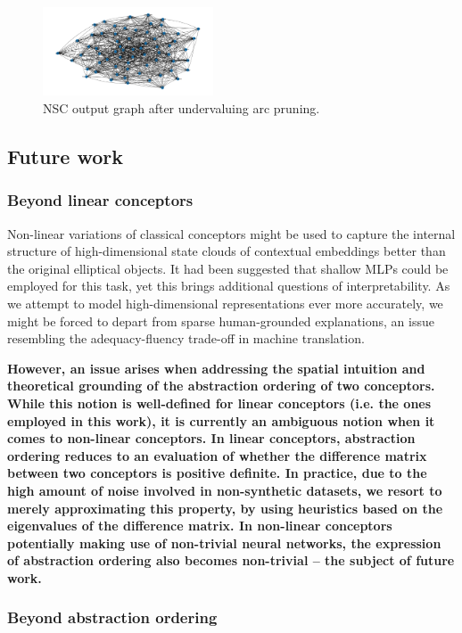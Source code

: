 \begin{figure}[h]
\centering
\includegraphics[width=0.45\textwidth]{img/short_run.png}
\caption{NSC output graph after undervaluing arc pruning.}\label{fig:pruning}
\end{figure}

\subsection{Future work}

\subsubsection{Beyond linear conceptors}

Non-linear variations of classical conceptors might be used to capture the internal structure of high-dimensional state clouds of contextual embeddings better than the original elliptical objects. It had been suggested that shallow MLPs could be employed for this task, yet this brings additional questions of interpretability. As we attempt to model high-dimensional representations ever more accurately, we might be forced to depart from sparse human-grounded explanations, an issue resembling the adequacy-fluency trade-off in machine translation.

\textbf{However, an issue arises when addressing the spatial intuition and theoretical grounding of the abstraction ordering of two conceptors. While this notion is well-defined for linear conceptors (i.e. the ones employed in this work), it is currently an ambiguous notion when it comes to non-linear conceptors. In linear conceptors, abstraction ordering reduces to an evaluation of whether the difference matrix between two conceptors is positive definite. In practice, due to the high amount of noise involved in non-synthetic datasets, we resort to merely approximating this property, by using heuristics based on the eigenvalues of the difference matrix. In non-linear conceptors potentially making use of non-trivial neural networks, the expression of abstraction ordering also becomes non-trivial -- the subject of future work.} 

\subsubsection{Beyond abstraction ordering}

